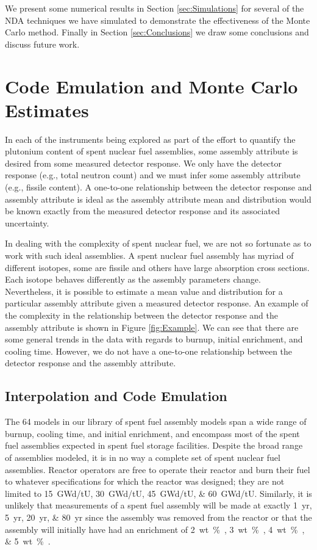 \documentclass{ansnse}
\begin{document}
We present some numerical results in Section \ref{sec:Simulations} for several of the NDA techniques we have simulated to demonstrate the effectiveness of the Monte Carlo method.  Finally in Section \ref{sec:Conclusions} we draw some conclusions and discuss future work.

\section{Code Emulation and Monte Carlo Estimates}\label{sec:MCEstimate}
In each of the instruments being explored as part of the effort to quantify the plutonium content of spent nuclear fuel assemblies, some assembly attribute is desired from some measured detector response.  We only have the detector response (e.g., total neutron count) and we must infer some assembly attribute (e.g., fissile content).  A one-to-one relationship between the detector response and assembly attribute is ideal as the assembly attribute mean and distribution would be known exactly from the measured detector response and its associated uncertainty. 

In dealing with the complexity of spent nuclear fuel, we are not so fortunate as to work with such ideal assemblies.  A spent nuclear fuel assembly has myriad of different isotopes, some are fissile and others have large absorption cross sections.  Each isotope behaves differently as the assembly parameters change.  Nevertheless, it is possible to estimate a mean value and distribution for a particular assembly attribute given a measured detector response.  An example of the complexity in the relationship between the detector response and the assembly attribute is shown in Figure \ref{fig:Example}.  We can see that there are some general trends in the data with regards to burnup, initial enrichment, and cooling time.  However, we do not have a one-to-one relationship between the detector response and the assembly attribute.

\subsection{Interpolation and Code Emulation}\label{sec:InterpolationandEmulation}
The 64 models in our library of spent fuel assembly models span a wide range of burnup, cooling time, and initial enrichment, and encompass most of the spent fuel assemblies expected in spent fuel storage facilities.  Despite the broad range of assemblies modeled, it is in no way a complete set of spent nuclear fuel assemblies.  Reactor operators are free to operate their reactor and burn their fuel to whatever specifications for which the reactor was designed; they are not limited to \SIlist[list-final-separator={, or }]{15; 30; 45; 60}{GWd/tU}.  Similarly, it is unlikely that measurements of a spent fuel assembly will be made at exactly \SIlist[list-final-separator={, or }]{1; 5; 20; 80}{yr} since the assembly was removed from the reactor or that the assembly will initially have had an enrichment of \SIlist[list-final-separator={, or }]{2;3;4;5}{wt \% }.  
\end{document}
